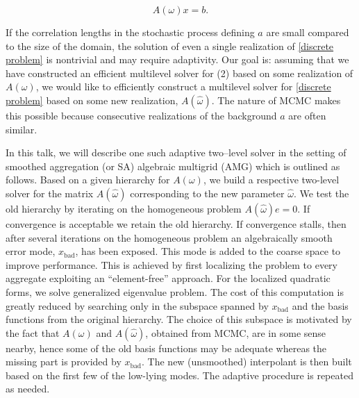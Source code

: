 \documentclass{report}
\begin{document}
\begin{equation}\label{discrete problem}
A(\omega) x = b.
\end{equation}

If the correlation lengths in the stochastic process defining $a$ are
small compared to the size of the domain,
the solution of even a single realization of \eqref{discrete problem} is
nontrivial and may require adaptivity.
Our goal is: assuming that we have constructed an efficient multilevel
solver for (2) based on some realization of $A(\omega)$, we would like to
efficiently construct a multilevel solver for \eqref{discrete problem}
based on some new realization, $A({\widehat \omega})$.
The nature of MCMC makes this possible because consecutive realizations
of the background $a$ are often similar.

In this talk, we will describe one such adaptive two--level solver in the
setting of smoothed aggregation (or SA) algebraic multigrid (AMG) which
is outlined as follows.
Based on a given hierarchy for $A(\omega)$,
we build a respective two-level solver for the matrix $A({\widehat
\omega})$ corresponding to the
new parameter ${\widehat \omega}$. We test the old hierarchy by iterating
on the homogeneous problem $A({\widehat \omega}) e = 0$. If convergence
is acceptable we retain the old hierarchy. If convergence stalls, then
after several iterations on the homogeneous problem an algebraically
smooth error mode, $x_{\text{bad}}$, has been exposed. This mode is added
to the coarse space to improve performance.
This is achieved by first localizing the problem to every aggregate
exploiting an ``element-free'' approach.
For the localized quadratic forms, we solve generalized eigenvalue
problem. The cost of this computation is greatly reduced by searching
only in the subspace spanned by $x_\text{bad}$ and the basis functions
from the original hierarchy. The choice of this subspace is motivated by
the fact that $A({\omega})$ and $A({\widehat \omega})$, obtained from
MCMC, are in some sense nearby, hence some of the old basis functions may
be adequate whereas the missing part is provided by $x_{\text{bad}}$. The
new (unsmoothed) interpolant is then built based on the first few of the
low-lying modes. The adaptive procedure is repeated as needed.
\end{document}
